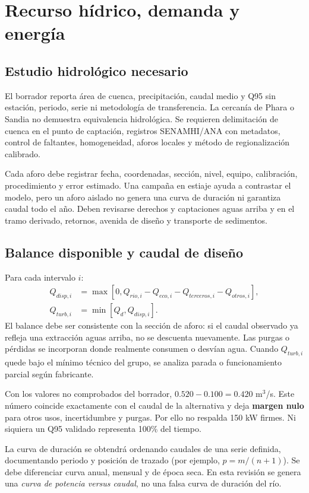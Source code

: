 \chapter{Recurso hídrico, demanda y energía}
\section{Estudio hidrológico necesario}
El borrador reporta área de cuenca, precipitación, caudal medio y Q95 sin estación, periodo, serie ni metodología de transferencia. La cercanía de Phara o Sandia no demuestra equivalencia hidrológica. Se requieren delimitación de cuenca en el punto de captación, registros SENAMHI/ANA con metadatos, control de faltantes, homogeneidad, aforos locales y método de regionalización calibrado.

Cada aforo debe registrar fecha, coordenadas, sección, nivel, equipo, calibración, procedimiento y error estimado. Una campaña en estiaje ayuda a contrastar el modelo, pero un aforo aislado no genera una curva de duración ni garantiza caudal todo el año. Deben revisarse derechos y captaciones aguas arriba y en el tramo derivado, retornos, avenida de diseño y transporte de sedimentos.

\section{Balance disponible y caudal de diseño}
Para cada intervalo $i$:
\begin{align}
Q_{disp,i}&=\max[0,Q_{rio,i}-Q_{eco,i}-Q_{terceros,i}-Q_{otros,i}],\\
Q_{turb,i}&=\min[Q_d,Q_{disp,i}].
\end{align}
El balance debe ser consistente con la sección de aforo: si el caudal observado ya refleja una extracción aguas arriba, no se descuenta nuevamente. Las purgas o pérdidas se incorporan donde realmente consumen o desvían agua. Cuando $Q_{turb,i}$ quede bajo el mínimo técnico del grupo, se analiza parada o funcionamiento parcial según fabricante.

Con los valores no comprobados del borrador, $0.520-0.100=0.420$ m$^3$/s. Este número coincide exactamente con el caudal de la alternativa y deja \textbf{margen nulo} para otros usos, incertidumbre y purgas. Por ello no respalda 150 kW firmes. Ni siquiera un Q95 validado representa 100\% del tiempo.

La curva de duración se obtendrá ordenando caudales de una serie definida, documentando periodo y posición de trazado (por ejemplo, $p=m/(n+1)$). Se debe diferenciar curva anual, mensual y de época seca. En esta revisión se genera una \emph{curva de potencia versus caudal}, no una falsa curva de duración del río.

